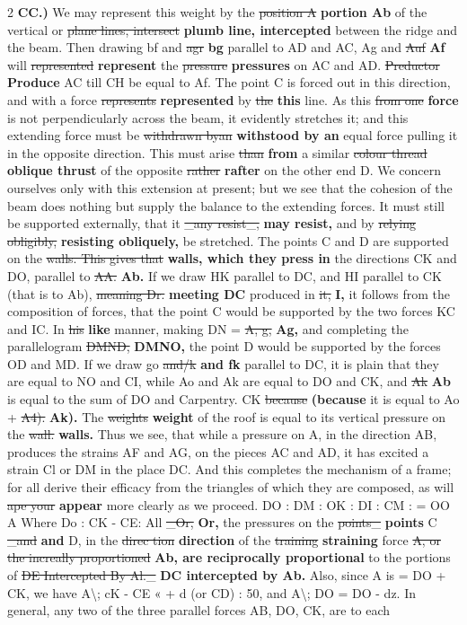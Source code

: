 \documentclass[10pt]{article}
\begin{document}
\begin{multicols}{2}
\textbf{CC.)} We may represent this weight by the \sout{position A} \textbf{portion Ab} of the vertical or \sout{plane lines, intersect} \textbf{plumb line, intercepted} between the ridge and the beam. Then drawing bf and \sout{agr} \textbf{bg} parallel to AD and AC, Ag and \sout{Auf} \textbf{Af} will \sout{represented} \textbf{represent} the \sout{pressure} \textbf{pressures} on AC and AD. \sout{Preductor} \textbf{Produce} AC till CH be equal to Af. The point C is forced out in this direction, and with a force \sout{represents} \textbf{represented} by \sout{the} \textbf{this} line. As this \sout{from one} \textbf{force} is not perpendicularly across the beam, it evidently stretches it; and this extending force must be \sout{withdrawn byan} \textbf{withstood by an} equal force pulling it in the opposite direction. This must arise \sout{than} \textbf{from} a similar \sout{colour thread} \textbf{oblique thrust} of the opposite \sout{rather} \textbf{rafter} on the other end D. We concern ourselves only with this extension at present; but we see that the cohesion of the beam does nothing but supply the balance to the extending forces. It must still be supported externally, that it \sout{\_any resist\_,} \textbf{may resist,} and by \sout{relying obligibly,} \textbf{resisting obliquely,} be stretched. The points C and D are supported on the \sout{walls. This gives that} \textbf{walls, which they press in} the directions CK and DO, parallel to \sout{AA.} \textbf{Ab.} If we draw HK parallel to DC, and HI parallel to CK (that is to Ab), \sout{meaning Dr.} \textbf{meeting DC} produced in \sout{it,} \textbf{I,} it follows from the composition of forces, that the point C would be supported by the two forces KC and IC. In \sout{his} \textbf{like} manner, making DN = \sout{A, g,} \textbf{Ag,} and completing the parallelogram \sout{DMND,} \textbf{DMNO,} the point D would be supported by the forces OD and MD. If we draw go \sout{and/k} \textbf{and fk} parallel to DC, it is plain that they are equal to NO and CI, while Ao and Ak are equal to DO and CK, and \sout{Ak} \textbf{Ab} is equal to the sum of DO and Carpentry. CK \sout{because} \textbf{(because} it is equal to Ao + \sout{A4).} \textbf{Ak).} The \sout{weights} \textbf{weight} of the roof is equal to its vertical pressure on the \sout{wall.} \textbf{walls.} Thus we see, that while a pressure on A, in the direction AB, produces the strains AF and AG, on the pieces AC and AD, it has excited a strain Cl or DM in the place DC. And this completes the mechanism of a frame; for all derive their efficacy from the triangles of which they are composed, as will \sout{ape your} \textbf{appear} more clearly as we proceed. DO : DM : OK : DI : CM : = OO A Where Do : CK - CE: All \sout{\_Or,} \textbf{Or,} the pressures on the \sout{points\_} \textbf{points} C \sout{\_and} \textbf{and} D, in the \sout{direc tion} \textbf{direction} of the \sout{training} \textbf{straining} force \sout{A, or the increally proportioned} \textbf{Ab, are reciprocally proportional} to the portions of \sout{DE Intercepted By Al.\_} \textbf{DC intercepted by Ab.} Also, since A is = DO + CK, we have A\textbackslash{}; cK - CE « + d (or CD) : 50, and A\textbackslash{}; DO = DO - dz. In general, any two of the three parallel forces AB, DO, CK, are to each 
\end{multicols}
\end{document}
